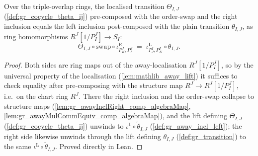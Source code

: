 \begin{lemma}\leanok
  \label{lem:gr_chartTransition'_ringIdentity}
  Over the triple-overlap rings, the localised transition \(\Theta_{I,J}\)
  (\cref{def:gr_cocycle_theta_ij}) pre-composed with the order-swap and the right
  inclusion equals the left inclusion post-composed with the plain transition
  \(\theta_{I,J}\), as ring homomorphisms \(R^J[1/P^J_I] \to S_I\):
  \[
    \Theta_{I,J} \circ \mathrm{swap} \circ \iota^{\mathrm{R}}_{P^J_K, P^J_I}
      \;=\; \iota^{\mathrm{L}}_{P^I_J, P^I_K} \circ \theta_{I,J} .
  \]
\end{lemma}
\begin{proof}
  \leanok
  Both sides are ring maps out of the away-localisation \(R^J[1/P^J_I]\), so by the
  universal property of the localisation (\cref{lem:mathlib_away_lift}) it suffices
  to check equality after pre-composing with the structure map
  \(R^J \to R^J[1/P^J_I]\), i.e.\ on the chart ring \(R^J\). There the right
  inclusion and the order-swap collapse to structure maps
  (\cref{lem:gr_awayInclRight_comp_algebraMap},
  \cref{lem:gr_awayMulCommEquiv_comp_algebraMap}), and the lift defining
  \(\Theta_{I,J}\) (\cref{def:gr_cocycle_theta_ij}) unwinds to
  \(\iota^{\mathrm{L}} \circ \tilde\theta_{I,J}\)
  (\cref{def:gr_away_incl_left}); the right side likewise unwinds through the lift
  defining \(\theta_{I,J}\) (\cref{def:gr_transition}) to the same
  \(\iota^{\mathrm{L}} \circ \tilde\theta_{I,J}\). Proved directly in Lean.
\end{proof}

